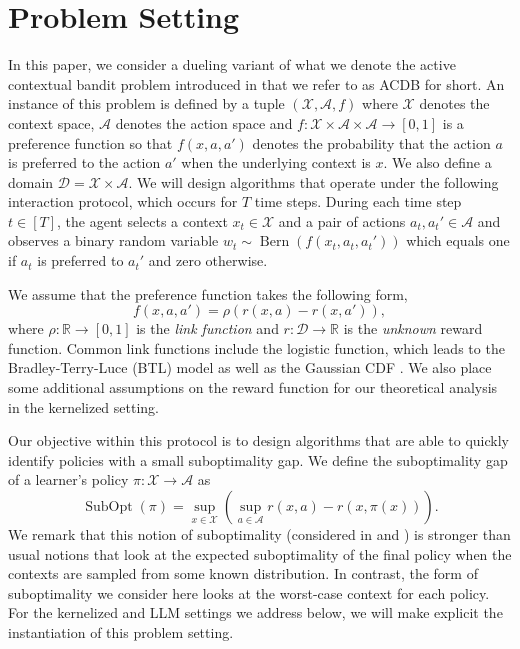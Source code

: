 \documentclass{article} \usepackage{iclr2023_conference,times}
\newcommand{\Rbb}{\mathbb{R}}
\newcommand{\Contextspace}{\mathcal{X}}
\newcommand{\Actionspace}{\mathcal{A}}
\DeclareMathOperator{\Bernoulli}{Bern}
\newcommand{\preferenceMatrix}{f}
\newcommand{\subopt}{\operatorname{SubOpt}}
\newcommand{\winner}{w}
\newcommand{\Domain}{\mathcal{D}}
\newcommand{\add}[1]{#1}
\newcommand{\linkfunction}{\add{\rho}}
\begin{document}
\section{Problem Setting}
\label{s:problem_setting}
\vspace{-2mm}
In this paper, we consider a dueling variant of \add{what we denote the active} contextual bandit problem introduced in \citet{char_ocbo} that we refer to as ACDB for short.
An instance of this problem is defined by a tuple $(\Contextspace, \Actionspace, \preferenceMatrix)$ where $\Contextspace$ denotes the context space, $\Actionspace$ denotes the action space and $\preferenceMatrix: \mathcal X \times \mathcal A \times \mathcal A \rightarrow [0, 1]$ is a preference function so that $\preferenceMatrix(x, a, a')$ denotes the probability that the action $a$ is preferred to the action $a'$ when the underlying context is $x$.
We also define a domain $\Domain = \Contextspace \times \Actionspace$.
We will design algorithms that operate under the following interaction protocol, which occurs for $T$ time steps.
During each time step $t \in [T]$, the agent selects a context $x_t \in \Contextspace$ and a pair of actions $a_t, a_t' \in \Actionspace$ and observes a binary random variable $\winner_t \sim \Bernoulli(\preferenceMatrix(x_t, a_t, a_t'))$ which equals one if $a_t$ is preferred to $a_t'$ and zero otherwise.

We assume that the preference function takes the following form,
\begin{equation}
    \label{eq:preference_function}
    \preferenceMatrix(x, a, a') = \linkfunction\left( r(x, a) - r(x, a') \right),
\end{equation}
where $\linkfunction : \Rbb \rightarrow [0, 1]$ is the \emph{link function} and $r: \Domain \rightarrow \Rbb$ is the \emph{unknown} reward function.
Common link functions include the logistic function, which leads to the Bradley-Terry-Luce (BTL) model \citep{bradley1952rank} as well as the Gaussian CDF \citep{thurstone1927method}.
We also place some additional assumptions on the reward function for our theoretical analysis in the kernelized setting.

Our objective within this protocol is to design algorithms that are able to quickly identify policies with a small suboptimality gap. We define the suboptimality gap of a learner's policy $\pi: \mathcal X \to \mathcal A$ as
\begin{equation}
    \subopt(\pi) = \sup_{x \in \Contextspace} \left( \sup_{a \in \Actionspace} r(x, a) - r(x, \pi(x)) \right).
\end{equation}
We remark that this notion of suboptimality (considered in \citet{char_ocbo} and \citet{li2023nearoptimal}) is stronger than usual notions that look at the expected suboptimality of the final policy when the contexts are sampled from some known distribution.
In contrast, the form of suboptimality we consider here looks at the worst-case context for each policy. For the kernelized and LLM settings we address below, we will make explicit the instantiation of this problem setting.
\end{document}
